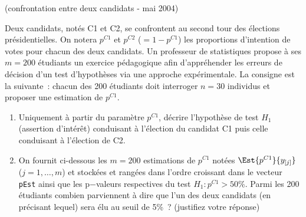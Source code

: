 \documentclass[10pt]{report}
\begin{document}
\begin{exercice} (confrontation entre deux candidats - mai 2004) 

Deux candidats, notés C1 et C2, se confrontent au second tour des élections présidentielles. On notera $p^{C1}$ et $p^{C2}$ ($=1-p^{C1}$) les proportions d'intention de votes pour chacun des deux candidats. Un professeur de statistiques propose à ses $m=200$ étudiants un exercice pédagogique afin d'appréhender les erreurs de décision d'un test d'hypothèses via une approche expérimentale. La consigne est la suivante~: chacun des 200 étudiants doit interroger $n=30$ individus et proposer une estimation de $p^{C1}$.

\begin{enumerate}
\item Uniquement à partir du paramètre $p^{C1}$, décrire l'hypothèse de test $H_1$ (assertion d'intérêt) conduisant à l'élection du candidat C1 puis celle conduisant à l'élection de C2.

\item On fournit ci-dessous les $m=200$ estimations de $p^{C1}$ notées $\Est{p^{C1}}{y_{[j]}}$ ($j=1,\ldots,m$) et stockées et rangées dans l'ordre croissant  dans le vecteur \texttt{pEst} ainsi que les  p$-$valeurs respectives du test $H_1: p^{C1}>50\%$. Parmi les  200 étudiants combien parviennent à dire que l'un des deux candidats (en précisant lequel) sera élu au seuil de 5\%~? (justifiez votre réponse)



\end{enumerate}
\end{exercice}
\end{document}
